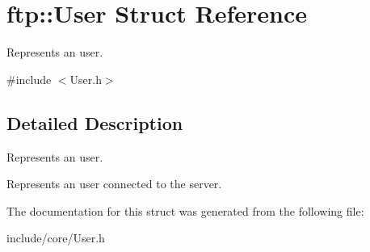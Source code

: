 \hypertarget{structftp_1_1_user}{\section{ftp\-:\-:User Struct Reference}
\label{structftp_1_1_user}
}


Represents an user.  




{\ttfamily \#include $<$User.\-h$>$}



\subsection{Detailed Description}
Represents an user. 

Represents an user connected to the server. 

The documentation for this struct was generated from the following file\-:\begin{DoxyCompactItemize}
\item 
include/core/User.\-h\end{DoxyCompactItemize}
